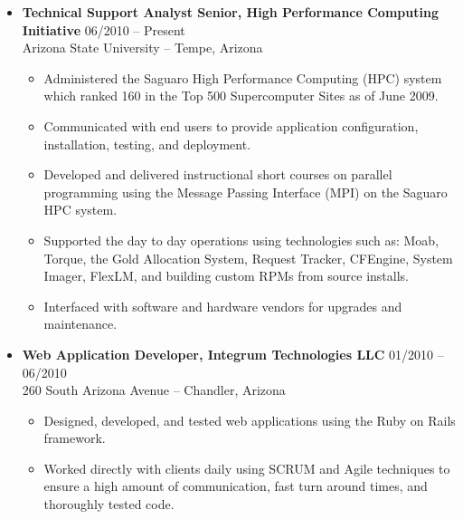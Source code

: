 \documentclass[10pt,letterpaper]{article}
\begin{document}
\begin{itemize}

\item \textbf{Technical Support Analyst Senior, High Performance Computing Initiative}
\hfill{06/2010 -- Present} \\
Arizona State University -- Tempe, Arizona

\begin{itemize}

	\item Administered the Saguaro High Performance Computing (HPC) system
	which ranked 160 in the Top 500 Supercomputer Sites as of June 2009.


  \item Communicated with end users to provide application configuration,
  installation, testing, and deployment.

  \item Developed and delivered instructional short courses on parallel
  programming using the Message Passing Interface (MPI) on the Saguaro HPC
  system.

  \item Supported the day to day operations using technologies such as: Moab,
  Torque, the Gold Allocation System, Request Tracker, CFEngine, System Imager,
  FlexLM, and building custom RPMs from source installs.

  \item Interfaced with software and hardware vendors for upgrades and
  maintenance.

\end{itemize}


\item \textbf{Web Application Developer, Integrum Technologies LLC}
\hfill{01/2010 -- 06/2010} \\
260 South Arizona Avenue -- Chandler, Arizona

\begin{itemize}

	\item Designed, developed, and tested web applications using the Ruby
	on Rails framework.

	\item Worked directly with clients daily using SCRUM and Agile
	techniques to ensure a high amount of communication, fast turn around
	times, and thoroughly tested code.


\end{itemize}
\end{itemize}
\end{document}
